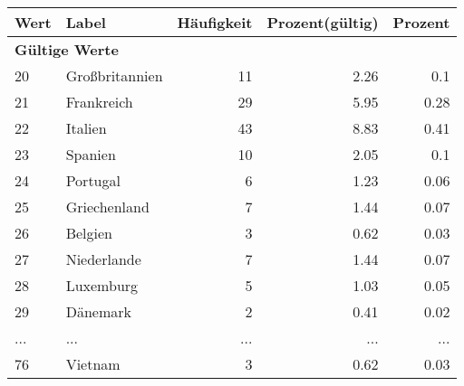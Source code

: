      \begin{longtable}{lXrrr}
     \toprule
     \textbf{Wert} & \textbf{Label} & \textbf{Häufigkeit} & \textbf{Prozent(gültig)} & \textbf{Prozent} \\
     \endhead
     \midrule
     \multicolumn{5}{l}{\textbf{Gültige Werte}}\\
        20 & \multicolumn{1}{X}{Großbritannien} & %
          \num{11} &
          \num[round-mode=places,round-precision=2]{2.26} &
          \num[round-mode=places,round-precision=2]{0.1} \\
        21 & \multicolumn{1}{X}{Frankreich} & %
          \num{29} &
          \num[round-mode=places,round-precision=2]{5.95} &
          \num[round-mode=places,round-precision=2]{0.28} \\
        22 & \multicolumn{1}{X}{Italien} & %
          \num{43} &
          \num[round-mode=places,round-precision=2]{8.83} &
          \num[round-mode=places,round-precision=2]{0.41} \\
        23 & \multicolumn{1}{X}{Spanien} & %
          \num{10} &
          \num[round-mode=places,round-precision=2]{2.05} &
          \num[round-mode=places,round-precision=2]{0.1} \\
        24 & \multicolumn{1}{X}{Portugal} & %
          \num{6} &
          \num[round-mode=places,round-precision=2]{1.23} &
          \num[round-mode=places,round-precision=2]{0.06} \\
        25 & \multicolumn{1}{X}{Griechenland} & %
          \num{7} &
          \num[round-mode=places,round-precision=2]{1.44} &
          \num[round-mode=places,round-precision=2]{0.07} \\
        26 & \multicolumn{1}{X}{Belgien} & %
          \num{3} &
          \num[round-mode=places,round-precision=2]{0.62} &
          \num[round-mode=places,round-precision=2]{0.03} \\
        27 & \multicolumn{1}{X}{Niederlande} & %
          \num{7} &
          \num[round-mode=places,round-precision=2]{1.44} &
          \num[round-mode=places,round-precision=2]{0.07} \\
        28 & \multicolumn{1}{X}{Luxemburg} & %
          \num{5} &
          \num[round-mode=places,round-precision=2]{1.03} &
          \num[round-mode=places,round-precision=2]{0.05} \\
        29 & \multicolumn{1}{X}{Dänemark} & %
          \num{2} &
          \num[round-mode=places,round-precision=2]{0.41} &
          \num[round-mode=places,round-precision=2]{0.02} \\
       ... & ... & ... & ... & ... \\
        76 & \multicolumn{1}{X}{Vietnam} & %
          \num{3} &
          \num[round-mode=places,round-precision=2]{0.62} &
          \num[round-mode=places,round-precision=2]{0.03} \\


\end{longtable}
